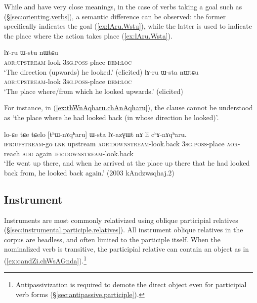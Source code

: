 While  and  have very close meanings, in the case of verbs taking a goal such as  (§\ref{sec:orienting.verbs}), a semantic difference can be observed: the former specifically indicates the goal (\ref{ex:lAru.Wstu}), while the latter is used to indicate the place where the action takes place (\ref{ex:lAru.Wsta}).

\begin{exe}
\ex 
\begin{xlist}
\ex \label{ex:lAru.Wstu}
\gll lɤ-ru ɯ-stu nɯtɕu \\
\textsc{aor}:\textsc{upstream}-look \textsc{3sg}.\textsc{poss}-place \textsc{dem}:\textsc{loc} \\
\glt `The direction (upwards) he looked.' (elicited)
\ex \label{ex:lAru.Wsta}
\gll lɤ-ru ɯ-sta nɯtɕu \\
\textsc{aor}:\textsc{upstream}-look \textsc{3sg}.\textsc{poss}-place \textsc{dem}:\textsc{loc} \\
\glt `The place where/from which he looked upwards.' (elicited)
\end{xlist}
\end{exe}
 
For instance, in (\ref{ex:thWnAqharu.chAnAqharu}), the clause  cannot be understood as `the place where he had looked back (in whose direction he looked)'.

\begin{exe}
\ex \label{ex:thWnAqharu.chAnAqharu}
 \gll lo-ɕe tɕe tɕelo [tʰɯ-nɤqʰaru] ɯ-sta lɤ-azɣɯt nɤ li cʰɤ-nɤqʰaru. \\
\textsc{ifr}:\textsc{upstream}-go \textsc{lnk} upstream \textsc{aor}:\textsc{downstream}-look.back \textsc{3sg}.\textsc{poss}-place \textsc{aor}-reach \textsc{add} again \textsc{ifr}:\textsc{downstream}-look.back  \\
\glt `He went up there, and when he arrived at the place up there that he had looked back from, he looked back again.' (2003 kAndzwsqhaj.2)
 \end{exe}
 

 
\subsection{Instrument} \label{sec:instrument.relativization}
Instruments are most commonly relativized using oblique participial relatives (§\ref{sec:instrumental.participle.relatives}). All instrument oblique relatives in the corpus are headless, and often limited to the participle itself. When the nominalized verb is transitive, the participial relative can contain an object  as in (\ref{ex:qandZi.chWsAGnda}).\footnote{Antipassivization is required to demote the direct object even for participial verb forms (§\ref{sec:antipassive.participle}). }

